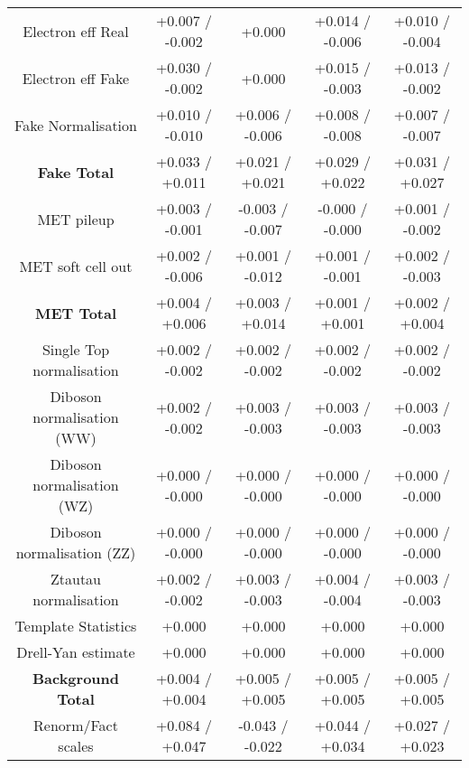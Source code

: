 \begin{table}[htbp]
\begin{center}
\begin{tabular}{|c|c|c|c|c|}
Electron eff Real                     &+0.007   / -0.002   & +0.000              & +0.014   / -0.006   & +0.010   / -0.004  \\
Electron eff Fake                     &+0.030   / -0.002   & +0.000              & +0.015   / -0.003   & +0.013   / -0.002  \\
Fake Normalisation                    &+0.010   / -0.010   & +0.006   / -0.006   & +0.008   / -0.008   & +0.007   / -0.007  \\
\hline
\textbf{Fake Total}                   &+0.033   / +0.011   & +0.021   / +0.021   & +0.029   / +0.022   & +0.031   / +0.027  \\
\hline
MET pileup                            &+0.003   / -0.001   & -0.003   / -0.007   & -0.000   / -0.000   & +0.001   / -0.002  \\
MET soft cell out                     &+0.002   / -0.006   & +0.001   / -0.012   & +0.001   / -0.001   & +0.002   / -0.003  \\
\hline
\textbf{MET Total}                    &+0.004   / +0.006   & +0.003   / +0.014   & +0.001   / +0.001   & +0.002   / +0.004  \\
\hline
Single Top normalisation              &+0.002   / -0.002   & +0.002   / -0.002   & +0.002   / -0.002   & +0.002   / -0.002  \\
Diboson normalisation (WW)            &+0.002   / -0.002   & +0.003   / -0.003   & +0.003   / -0.003   & +0.003   / -0.003  \\
Diboson normalisation (WZ)            &+0.000   / -0.000   & +0.000   / -0.000   & +0.000   / -0.000   & +0.000   / -0.000  \\
Diboson normalisation (ZZ)            &+0.000   / -0.000   & +0.000   / -0.000   & +0.000   / -0.000   & +0.000   / -0.000  \\
Ztautau normalisation                 &+0.002   / -0.002   & +0.003   / -0.003   & +0.004   / -0.004   & +0.003   / -0.003  \\
Template Statistics                   &+0.000              & +0.000              & +0.000              & +0.000             \\
Drell-Yan estimate                    &+0.000              & +0.000              & +0.000              & +0.000             \\
\hline
\textbf{Background Total}             &+0.004   / +0.004   & +0.005   / +0.005   & +0.005   / +0.005   & +0.005   / +0.005  \\
\hline
Renorm/Fact scales                    &+0.084   / +0.047   & -0.043   / -0.022   & +0.044   / +0.034   & +0.027   / +0.023  \\

\end{tabular}
\end{center}
\end{table}
